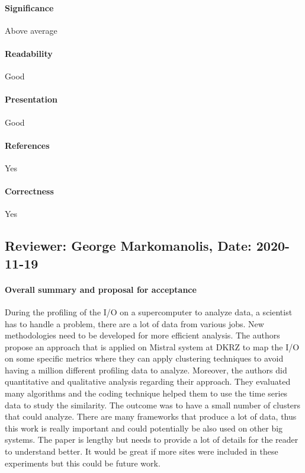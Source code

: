 \documentclass{jhps}
\begin{document}
{{{{\paragraph{Significance}   %
Above average
\paragraph{Readability}   %
Good
\paragraph{Presentation}
Good
\paragraph{References}   %
Yes
\paragraph{Correctness}   %
Yes



	 	 	 	
\subsection*{Reviewer: George Markomanolis, Date: 2020-11-19}
\paragraph{Overall summary and proposal for acceptance}
During the profiling of the I/O on a supercomputer to analyze data, a scientist has to handle a problem, there are a lot of data from various jobs. New methodologies need to be developed for more efficient analysis. The authors propose an approach that is applied on Mistral system at DKRZ to map the I/O on some specific metrics where they can apply clustering techniques to avoid having a million different profiling data to analyze. Moreover, the authors did quantitative and qualitative analysis regarding their approach. They evaluated many algorithms and the coding technique helped them to use the time series data to study the similarity. The outcome was to have a small number of clusters that could analyze. There are many frameworks that produce a lot of data, thus this work is really important and could potentially be also used on other big systems.
The paper is lengthy but needs to provide a lot of details for the reader to understand better. It would be great if more sites were included in these experiments but this could be future work.
}}}}
\end{document}
